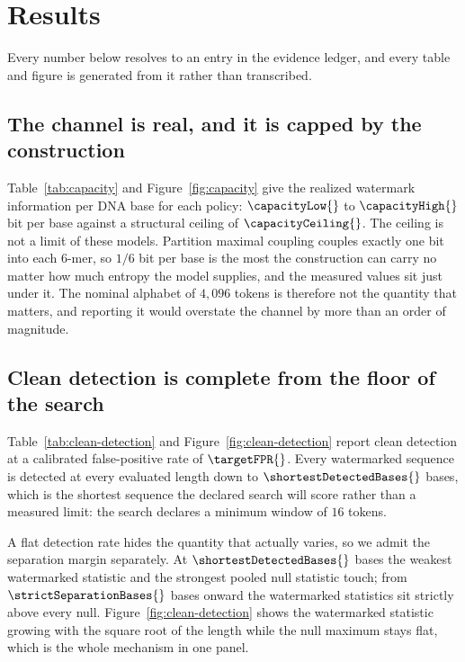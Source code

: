 \section{Results}
\label{sec:results}

Every number below resolves to an entry in the evidence ledger, and every table and figure is
generated from it rather than transcribed.

\subsection{The channel is real, and it is capped by the construction}

Table~\ref{tab:capacity} and Figure~\ref{fig:capacity} give the realized watermark information per DNA
base for each policy: $\capacityLow{}$ to $\capacityHigh{}$ bit per base against a structural ceiling
of $\capacityCeiling{}$. The ceiling is not a limit of these models. Partition maximal coupling
couples exactly one bit into each 6-mer, so $1/6$ bit per base is the most the construction can carry
no matter how much entropy the model supplies, and the measured values sit just under it. The nominal
alphabet of $4{,}096$ tokens is therefore not the quantity that matters, and reporting it would
overstate the channel by more than an order of magnitude.



\subsection{Clean detection is complete from the floor of the search}

Table~\ref{tab:clean-detection} and Figure~\ref{fig:clean-detection} report clean detection at a
calibrated false-positive rate of $\targetFPR{}$. Every watermarked sequence is detected at every
evaluated length down to $\shortestDetectedBases{}$ bases, which is the shortest sequence the declared
search will score rather than a measured limit: the search declares a minimum window of $16$ tokens.

A flat detection rate hides the quantity that actually varies, so we admit the separation margin
separately. At $\shortestDetectedBases{}$ bases the weakest watermarked statistic and the strongest
pooled null statistic touch; from $\strictSeparationBases{}$ bases onward the watermarked statistics
sit strictly above every null. Figure~\ref{fig:clean-detection} shows the watermarked statistic growing
with the square root of the length while the null maximum stays flat, which is the whole mechanism in
one panel.

